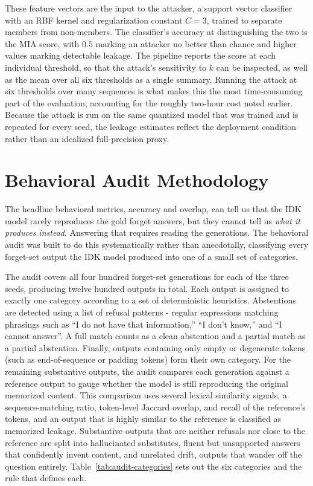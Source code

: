 \documentclass[a4paper,12pt]{report}
\begin{document}
These feature vectors are the input to the attacker, a support vector classifier with an RBF kernel and regularization constant $C = 3$, trained to separate members from non-members. The classifier's accuracy at distinguishing the two is the MIA score, with $0.5$ marking an attacker no better than chance and higher values marking detectable leakage. The pipeline reports the score at each individual threshold, so that the attack's sensitivity to $k$ can be inspected, as well as the mean over all six thresholds as a single summary. Running the attack at six thresholds over many sequences is what makes this the most time-consuming part of the evaluation, accounting for the roughly two-hour cost noted earlier. Because the attack is run on the same quantized model that was trained and is repeated for every seed, the leakage estimates reflect the deployment condition rather than an idealized full-precision proxy.

\section{Behavioral Audit Methodology}
\label{sec:setup-audit}
The headline behavioral metrics, accuracy and overlap, can tell us that the IDK model rarely reproduces the gold forget answers, but they cannot tell us \emph{what it produces instead}. Answering that requires reading the generations. The behavioral audit was built to do this systematically rather than anecdotally, classifying every forget-set output the IDK model produced into one of a small set of categories.

The audit covers all four hundred forget-set generations for each of the three seeds, producing twelve hundred outputs in total. Each output is assigned to exactly one category according to a set of deterministic heuristics. Abstentions are detected using a list of refusal patterns - regular expressions matching phrasings such as ``I do not have that information,'' ``I don't know,'' and ``I cannot answer''. A full match counts as a clean abstention and a partial match as a partial abstention. Finally, outputs containing only empty or degenerate tokens (such as end-of-sequence or padding tokens) form their own category. For the remaining substantive outputs, the audit compares each generation against a reference output to gauge whether the model is still reproducing the original memorized content. This comparison uses several lexical similarity signals, a sequence-matching ratio, token-level Jaccard overlap, and recall of the reference's tokens, and an output that is highly similar to the reference is classified as memorized leakage. Substantive outputs that are neither refusals nor close to the reference are split into hallucinated substitutes, fluent but unsupported answers that confidently invent content, and unrelated drift, outputs that wander off the question entirely. Table~\ref{tab:audit-categories} sets out the six categories and the rule that defines each.
\end{document}
